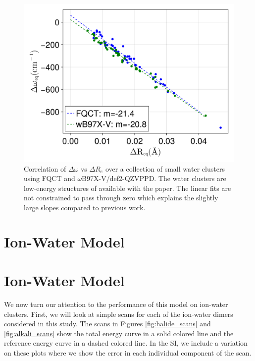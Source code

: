 \documentclass[journal=jctcce,manuscript=article]{achemso}
\begin{document}
\begin{figure}[h]
  \includegraphics*[width=\textwidth]{figures/badger_correlation_final.png}
  \caption{Correlation of $\Delta\omega$ vs $\Delta R_e$ over a collection
  of small water clusters using FQCT and $\omega$B97X-V/def2-QZVPPD.
  The water clusters are low-energy structures of  available
  with the paper. The linear fits are not constrained to pass through zero
  which explains the slightly large slopes compared to previous work.\cite{boyer2019beyond}
}
  \label{fig:badger}
\end{figure}

\section*{Ion-Water Model}

\section*{Ion-Water Model}

We now turn our attention to the performance of this model on ion-water clusters. First, we will look at simple scans for each of the ion-water dimers considered in this study. The scans in Figures \ref{fig:halide_scans} and \ref{fig:alkali_scans} show the total energy curve in a solid colored line and the reference energy curve in a dashed colored line. In the SI, we include a variation on these plots where we show the error in each individual component of the scan.
\end{document}
